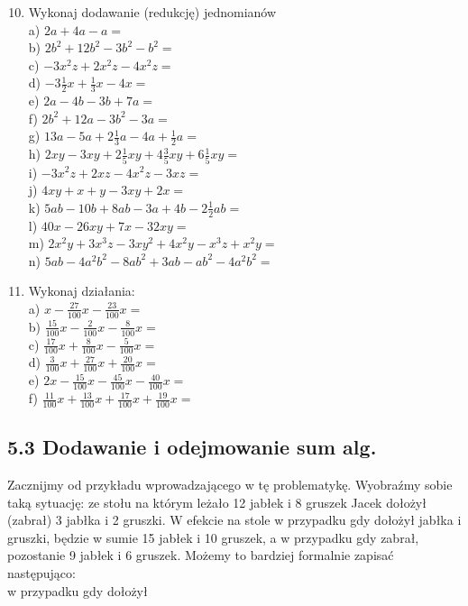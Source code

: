 \documentclass[10pt]{article}
\begin{document}
\begin{enumerate}
  \setcounter{enumi}{9}
  \item Wykonaj dodawanie (redukcję) jednomianów\\
a) \(2 a+4 a-a=\)\\
b) \(2 b^{2}+12 b^{2}-3 b^{2}-b^{2}=\)\\
c) \(-3 x^{2} z+2 x^{2} z-4 x^{2} z=\)\\
d) \(-3 \frac{1}{2} x+\frac{1}{3} x-4 x=\)\\
e) \(2 a-4 b-3 b+7 a=\)\\
f) \(2 b^{2}+12 a-3 b^{2}-3 a=\)\\
g) \(13 a-5 a+2 \frac{1}{3} a-4 a+\frac{1}{2} a=\)\\
h) \(2 x y-3 x y+2 \frac{1}{5} x y+4 \frac{3}{5} x y+6 \frac{1}{5} x y=\)\\
i) \(-3 x^{2} z+2 x z-4 x^{2} z-3 x z=\)\\
j) \(4 x y+x+y-3 x y+2 x=\)\\
k) \(5 a b-10 b+8 a b-3 a+4 b-2 \frac{1}{2} a b=\)\\
l) \(40 x-26 x y+7 x-32 x y=\)\\
m) \(2 x^{2} y+3 x^{3} z-3 x y^{2}+4 x^{2} y-x^{3} z+x^{2} y=\)\\
n) \(5 a b-4 a^{2} b^{2}-8 a b^{2}+3 a b-a b^{2}-4 a^{2} b^{2}=\)
  \item Wykonaj działania:\\
a) \(x-\frac{27}{100} x-\frac{23}{100} x=\)\\
b) \(\frac{15}{100} x-\frac{2}{100} x-\frac{8}{100} x=\)\\
c) \(\frac{17}{100} x+\frac{8}{100} x-\frac{5}{100} x=\)\\
d) \(\frac{3}{100} x+\frac{27}{100} x+\frac{20}{100} x=\)\\
e) \(2 x-\frac{15}{100} x-\frac{45}{100} x-\frac{40}{100} x=\)\\
f) \(\frac{11}{100} x+\frac{13}{100} x+\frac{17}{100} x+\frac{19}{100} x=\)
\end{enumerate}

\subsection*{5.3 Dodawanie i odejmowanie sum alg.}
Zacznijmy od przykładu wprowadzającego w tę problematykę. Wyobraźmy sobie taką sytuację: ze stołu na którym leżało 12 jabłek i 8 gruszek Jacek dołożył (zabrał) 3 jabłka i 2 gruszki. W efekcie na stole w przypadku gdy dołożył jabłka i gruszki, będzie w sumie 15 jabłek i 10 gruszek, a w przypadku gdy zabrał, pozostanie 9 jabłek i 6 gruszek. Możemy to bardziej formalnie zapisać następująco:\\
w przypadku gdy dołożył
\end{document}
